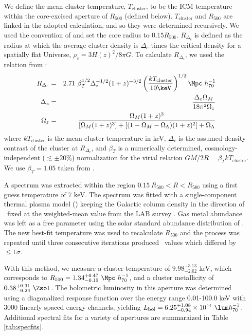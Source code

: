 \documentclass{emulateapj}
\begin{document}
We define the mean cluster temperature, $T_{\mathrm{cluster}}$, to be
the ICM temperature within the core-excised aperture of $R_{500}$
(defined below). $T_{\mathrm{cluster}}$ and $R_{500}$ are linked in
the adopted calculation, and so they were determined recursively. We
used the convention of \citet{2007ApJ...668..772M} and set the core
radius to $0.15 R_{500}$. $R_{\Delta_c}$ is defined as the radius at
which the average cluster density is $\Delta_c$ times the critical
density for a spatially flat Universe, $\rho_c=3H(z)^2/8\pi G$. To
calculate $R_{\Delta_c}$, we used the relation from
\cite{2002A&A...389....1A}:
\begin{eqnarray}
  R_{\Delta_c} &=& 2.71~\beta_T^{1/2} \Delta_z^{-1/2} (1+z)^{-3/2} \left(\frac{kT_{\mathrm{cluster}}}{10 \keV}\right)^{1/2} \Mpc~h_{70}^{-1} \nonumber \\
  \Delta_z &=& \frac{\Delta_c \Omega_M}{18\pi^2\Omega_z} \nonumber \\
  \Omega_z &=& \frac{\Omega_M (1+z)^3}{[\Omega_M (1+z)^3]+[(1-\Omega_M-\Omega_{\Lambda})(1+z)^2]+\Omega_{\Lambda}} \nonumber
\end{eqnarray}
where $kT_{\mathrm{cluster}}$ is the mean cluster temperature in keV,
$\Delta_c$ is the assumed density contrast of the cluster at
$R_{\Delta_c}$, and $\beta_T$ is a numerically determined,
cosmology-independent ($\lesssim \pm 20\%$) normalization for the
virial relation $GM/2R = \beta_TkT_{\mathrm{cluster}}$. We use
$\beta_T = 1.05$ taken from \cite{1996ApJ...469..494E}.

A spectrum was extracted within the region $0.15~R_{500} < R <
R_{500}$ using a first guess temperature of 7 keV. The spectrum was
fitted with a single-component thermal plasma model (\mekal) keeping
the Galactic column density in the direction of \iras\ fixed at the
weighted-mean value from the LAB survey \citep[$\nhi =
  1.58\times10^{20}~\pcmsq$;][]{lab}. Gas metal abundance was left as
a free parameter using the solar standard abundance distribution of
\citet{grsa}. The new best-fit temperature was used to recalculate
$R_{500}$ and the process was repeated until three consecutive
iterations produced \tx\ values which differed by $\leq 1\sigma$.

With this method, we measure a cluster temperature of
$9.98^{+3.13}_{-2.02}$ keV, which corresponds to $R_{500} =
1.34^{+0.47}_{-0.19}~\Mpc~h_{70}^{-1}$, and a cluster metallicity of
$0.38^{+0.31}_{-0.24}~\Zsol$. The bolometric luminosity in this
aperture was determined using a diagonalized response function over
the energy range 0.01-100.0 keV with 3000 linearly spaced energy
channels, yielding $L_{\mathrm{bol}} =
6.25^{+1.08}_{-0.94}\times10^{44}~\lum h_{70}^{-1}$. Additional
spectral fits for a variety of apertures are summaraized in Table
\ref{tab:specfits}.
\end{document}
